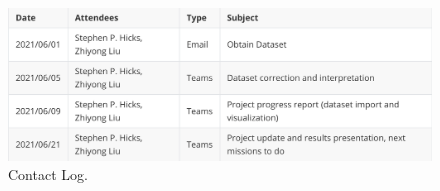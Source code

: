 \documentclass[project-plan]{report-template}
\begin{document}


\clearpage
\begin{figure}
    \begin{center}
        \includegraphics[width=1\textwidth]{contact.png}
    \end{center}
    \caption{\label{fig:contact} Contact Log.}
\end{figure}
\end{document}
